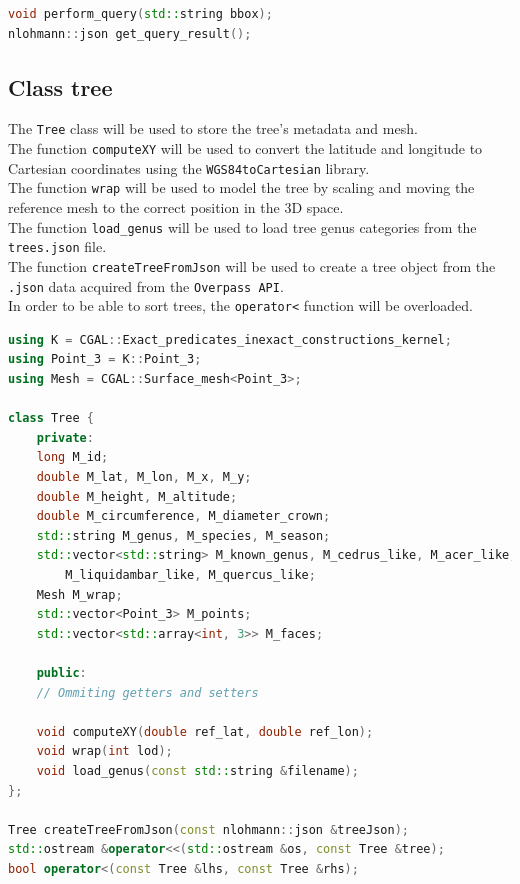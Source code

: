 \documentclass[12pt]{article}
\begin{document}
\begin{lstlisting}[language=C++]
void perform_query(std::string bbox);
nlohmann::json get_query_result();
\end{lstlisting}

\subsection{Class tree}

The \texttt{Tree} class will be used to store the tree's metadata and mesh. \\
The function \texttt{computeXY} will be used to convert the latitude and longitude
to Cartesian coordinates using the \texttt{WGS84toCartesian} library. \\
The function \texttt{wrap} will be used to model the tree by scaling and moving
the reference mesh to the correct position in the 3D space. \\
The function \texttt{load\_genus} will be used to load tree genus categories from
the \texttt{trees.json} file. \\
The function \texttt{createTreeFromJson} will be used to create a tree object from
the \texttt{.json} data acquired from the \texttt{Overpass API}. \\
In order to be able to sort trees, the \texttt{operator<} function will be overloaded.


\begin{lstlisting}[language=C++]
using K = CGAL::Exact_predicates_inexact_constructions_kernel;
using Point_3 = K::Point_3;
using Mesh = CGAL::Surface_mesh<Point_3>;

class Tree {
    private:
    long M_id;
    double M_lat, M_lon, M_x, M_y;
    double M_height, M_altitude;
    double M_circumference, M_diameter_crown;
    std::string M_genus, M_species, M_season;
    std::vector<std::string> M_known_genus, M_cedrus_like, M_acer_like,
        M_liquidambar_like, M_quercus_like;
    Mesh M_wrap;
    std::vector<Point_3> M_points;
    std::vector<std::array<int, 3>> M_faces;

    public:
    // Ommiting getters and setters

    void computeXY(double ref_lat, double ref_lon);
    void wrap(int lod);
    void load_genus(const std::string &filename);
};

Tree createTreeFromJson(const nlohmann::json &treeJson);
std::ostream &operator<<(std::ostream &os, const Tree &tree);
bool operator<(const Tree &lhs, const Tree &rhs);
\end{lstlisting}
\end{document}

